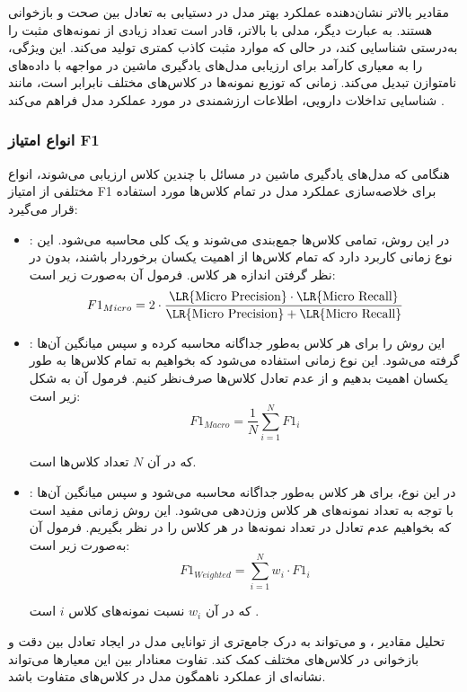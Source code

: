 مقادیر بالاتر  نشان‌دهنده عملکرد بهتر مدل در دستیابی به تعادل بین صحت و بازخوانی هستند. به عبارت دیگر، مدلی با  بالاتر، قادر است تعداد زیادی از نمونه‌های مثبت را به‌درستی شناسایی کند، در حالی که موارد مثبت کاذب کمتری تولید می‌کند. این ویژگی،  را به معیاری کارآمد برای ارزیابی مدل‌های یادگیری ماشین در مواجهه با داده‌های نامتوازن تبدیل می‌کند. زمانی که توزیع نمونه‌ها در کلاس‌های مختلف نابرابر است، مانند شناسایی تداخلات دارویی،  اطلاعات ارزشمندی در مورد عملکرد مدل فراهم می‌کند \cite{ref_sokolova2009}.

\subsubsection{انواع امتیاز F1}

هنگامی که مدل‌های یادگیری ماشین در مسائل با چندین کلاس ارزیابی می‌شوند، انواع مختلفی از امتیاز F1 برای خلاصه‌سازی عملکرد مدل در تمام کلاس‌ها مورد استفاده قرار می‌گیرد:

\begin{itemize}
	\item \textbf{}: در این روش، تمامی کلاس‌ها جمع‌بندی می‌شوند و یک  کلی محاسبه می‌شود. این نوع  زمانی کاربرد دارد که تمام کلاس‌ها از اهمیت یکسان برخوردار باشند، بدون در نظر گرفتن اندازه هر کلاس. فرمول آن به‌صورت زیر است:
	\begin{equation}
		F1_{Micro} = 2 \cdot \frac{\text{\LR{Micro Precision}} \cdot \text{\LR{Micro Recall}}}{\text{\LR{Micro Precision}} + \text{\LR{Micro Recall}}}
	\end{equation}
	
	\item \textbf{}: این روش  را برای هر کلاس به‌طور جداگانه محاسبه کرده و سپس میانگین آن‌ها گرفته می‌شود. این نوع  زمانی استفاده می‌شود که بخواهیم به تمام کلاس‌ها به طور یکسان اهمیت بدهیم و از عدم تعادل کلاس‌ها صرف‌نظر کنیم. فرمول آن به شکل زیر است:
	\begin{equation}
		F1_{Macro} = \frac{1}{N} \sum_{i=1}^{N} F1_i
	\end{equation}	
	
	که در آن \( N \) تعداد کلاس‌ها است.
	
	\item \textbf{}: در این نوع،  برای هر کلاس به‌طور جداگانه محاسبه می‌شود و سپس میانگین آن‌ها با توجه به تعداد نمونه‌های هر کلاس وزن‌دهی می‌شود. این روش زمانی مفید است که بخواهیم عدم تعادل در تعداد نمونه‌ها در هر کلاس را در نظر بگیریم. فرمول آن به‌صورت زیر است:
	\begin{equation}
		F1_{Weighted} = \sum_{i=1}^{N} w_i \cdot F1_i
	\end{equation}
	
	که در آن \( w_i \) نسبت نمونه‌های کلاس \( i \) است \cite{ref_manning2008}.
\end{itemize}
تحلیل مقادیر ،  و  می‌تواند به درک جامع‌تری از توانایی مدل در ایجاد تعادل بین دقت و بازخوانی در کلاس‌های مختلف کمک کند. تفاوت معنادار بین این معیارها می‌تواند نشانه‌ای از عملکرد ناهمگون مدل در کلاس‌های متفاوت باشد.

